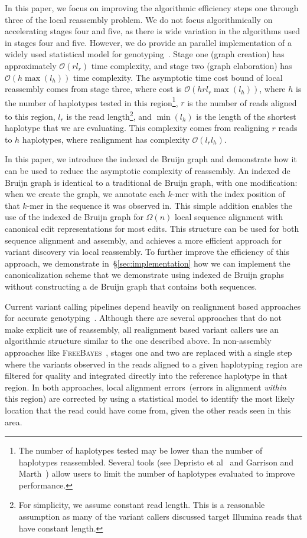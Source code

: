 \documentclass[phd]{ucbthesis}
\begin{document}
In this paper, we focus on improving the algorithmic efficiency steps one through three of the local reassembly problem.
We do not focus algorithmically on accelerating stages four and five, as there is wide
variation in the algorithms used in stages four and five. However, we do provide an parallel
implementation of a widely used statistical model for genotyping~\cite{li11}. Stage one (graph
creation) has approximately $\mathcal{O}(r l_r)$ time complexity, and stage two (graph elaboration) has
$\mathcal{O}(h \max(l_h))$ time complexity.
The asymptotic time cost bound of local reassembly comes from stage three, where cost is $\mathcal{O}(h r l_r
\max(l_h))$, where $h$ is the number of haplotypes tested in this region\footnote{The number of
haplotypes tested may be lower than the number of haplotypes reassembled. Several tools
(see Depristo et al~\cite{depristo11} and Garrison and Marth~\cite{garrison12}) allow users to limit the number of haplotypes evaluated to improve
performance.}, $r$ is the number of reads aligned to this region, $l_r$ is the read length\footnote{For
simplicity, we assume constant read length. This is a reasonable assumption as many of the variant
callers discussed target Illumina reads that have constant length.}, and $\min(l_h)$ is the length of the
shortest haplotype that we are evaluating. This complexity comes from realigning $r$ reads to $h$
haplotypes, where realignment has complexity $\mathcal{O}(l_r l_h)$.

In this paper, we introduce the indexed de Bruijn graph and demonstrate how it can be used to
reduce the asymptotic complexity of reassembly. An indexed de Bruijn graph is identical to a
traditional de Bruijn graph, with one modification: when we create the graph, we annotate each
$k$-mer with the index position of that $k$-mer in the sequence it was observed in. This simple addition
enables the use of the indexed de Bruijn graph for $\Omega(n)$ local sequence alignment with
canonical edit representations for most edits. This structure can be used for both sequence alignment and
assembly, and achieves a more efficient approach for variant discovery via local reassembly.
To further improve the efficiency of this approach, we demonstrate in~\S\ref{sec:implementation}
how we can implement the canonicalization scheme that we demonstrate using indexed de Bruijn
graphs without constructing a de Bruijn graph that contains both sequences.

Current variant calling pipelines depend heavily on realignment based approaches for accurate
genotyping~\cite{li14}. Although there are several approaches that do not make explicit use of reassembly,
all realignment based variant callers use an algorithmic structure similar to the one described
above. In non-assembly approaches like \textsc{FreeBayes}~\cite{garrison12}, stages
one and two are replaced with a single step where the variants observed in the reads aligned to a given
haplotyping region are filtered for quality and integrated directly into the reference haplotype in that region.
In both approaches, local alignment errors~(errors in alignment \emph{within} this region) are corrected
by using a statistical model to identify the most likely location that the read could have come from, given
the other reads seen in this area.
\end{document}
